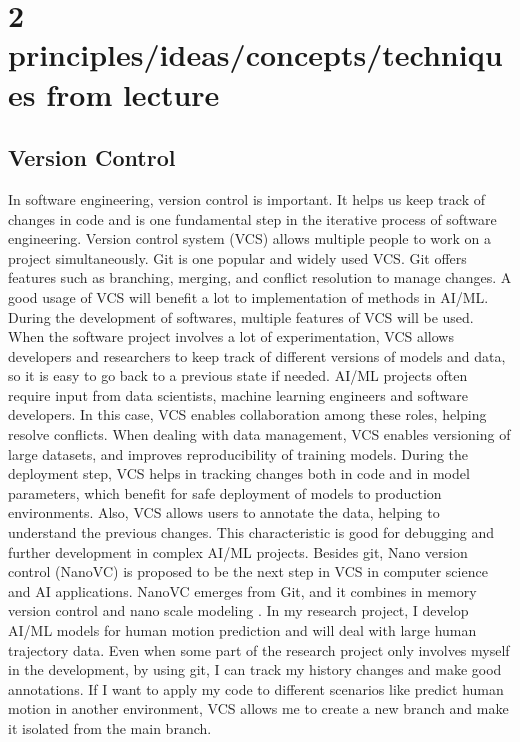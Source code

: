 \documentclass[11pt]{article}
\begin{document}
\section{2 principles/ideas/concepts/techniques from lecture}

\subsection{Version Control}
In software engineering, version control is important. It helps us keep track of changes in code and is one fundamental step in the iterative process of software engineering. Version control system (VCS) allows multiple people to work on a project simultaneously. Git is one popular and widely used VCS. Git offers features such as branching, merging, and conflict resolution to manage changes. A good usage of VCS will benefit a lot to implementation of methods in AI/ML. During the development of softwares, multiple features of VCS will be used. When the software project involves a lot of experimentation, VCS allows developers and researchers to keep track of different versions of models and data, so it is easy to go back to a previous state if needed. AI/ML projects often require input from data scientists, machine learning engineers and software developers. In this case, VCS enables collaboration among these roles, helping resolve conflicts. When dealing with data management, VCS enables versioning of large datasets, and improves reproducibility of training models. During the deployment step, VCS helps in tracking changes both in code and in model parameters, which benefit for safe deployment of models to production environments. Also, VCS allows users to annotate the data, helping to understand the previous changes. This characteristic is good for debugging and further development in complex AI/ML projects. Besides git, Nano version control (NanoVC) is proposed to be the next step in VCS in computer science and AI applications. NanoVC emerges from Git, and it combines in memory version control and nano scale modeling \cite{versioncontrol}. In my research project, I develop AI/ML models for human motion prediction and will deal with large human trajectory data. Even when some part of the research project only involves myself in the development, by using git, I can track my history changes and make good annotations. If I want to apply my code to different scenarios like predict human motion in another environment, VCS allows me to create a new branch and make it isolated from the main branch.
\end{document}
